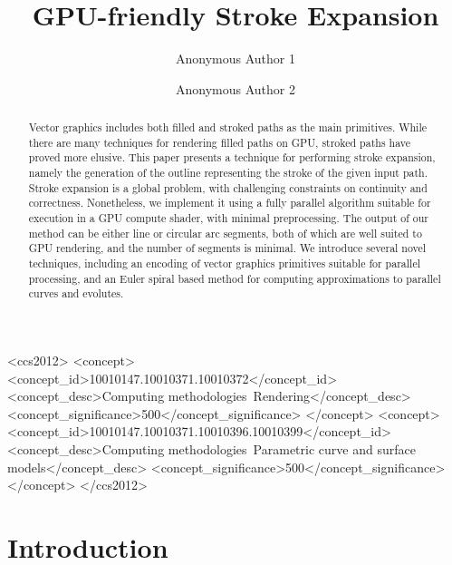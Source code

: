 \documentclass[sigconf]{acmart}
\begin{document}
\title{GPU-friendly Stroke Expansion}
\author{Anonymous Author 1}
\author{Anonymous Author 2}
\begin{CCSXML}
    <ccs2012>
       <concept>
           <concept_id>10010147.10010371.10010372</concept_id>
           <concept_desc>Computing methodologies~Rendering</concept_desc>
           <concept_significance>500</concept_significance>
           </concept>
       <concept>
           <concept_id>10010147.10010371.10010396.10010399</concept_id>
           <concept_desc>Computing methodologies~Parametric curve and surface models</concept_desc>
           <concept_significance>500</concept_significance>
           </concept>
     </ccs2012>
\end{CCSXML}



\begin{abstract}
    Vector graphics includes both filled and stroked paths as the main primitives. While there are many techniques for rendering filled paths on GPU, stroked paths have proved more elusive. This paper presents a technique for performing stroke expansion, namely the generation of the outline representing the stroke of the given input path. Stroke expansion is a global problem, with challenging constraints on continuity and correctness. Nonetheless, we implement it using a fully parallel algorithm suitable for execution in a GPU compute shader, with minimal preprocessing. The output of our method can be either line or circular arc segments, both of which are well suited to GPU rendering, and the number of segments is minimal. We introduce several novel techniques, including an encoding of vector graphics primitives suitable for parallel processing, and an Euler spiral based method for computing approximations to parallel curves and evolutes.
\end{abstract}


\maketitle
\thispagestyle{empty}
\pagestyle{plain}

\section{Introduction}
\end{document}
